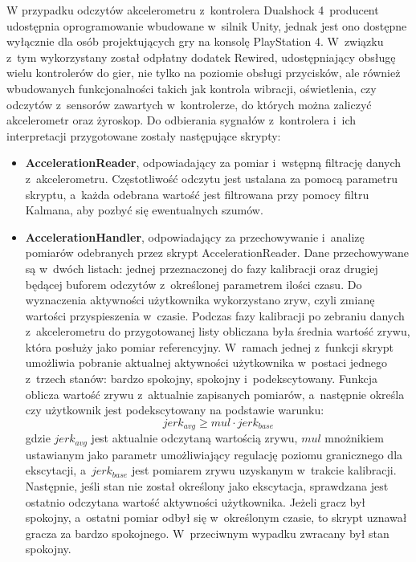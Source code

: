 W przypadku odczytów akcelerometru z~kontrolera Dualshock 4~producent udostępnia oprogramowanie wbudowane w~silnik Unity, jednak jest ono dostępne wyłącznie dla osób projektujących gry na konsolę PlayStation 4. W~związku z~tym wykorzystany został odpłatny dodatek Rewired, udostępniający obsługę wielu kontrolerów do gier, nie tylko na poziomie obsługi przycisków, ale również wbudowanych funkcjonalności takich jak kontrola wibracji, oświetlenia, czy odczytów z~sensorów zawartych w~kontrolerze, do których można zaliczyć akcelerometr oraz żyroskop. Do odbierania sygnałów z~kontrolera i~ich interpretacji przygotowane zostały następujące skrypty:
\begin{itemize}
	\item \textbf{AccelerationReader}, odpowiadający za pomiar i~wstępną filtrację danych z~akcelerometru. Częstotliwość odczytu jest ustalana za pomocą parametru skryptu, a~każda odebrana wartość jest filtrowana przy pomocy filtru Kalmana, aby pozbyć się ewentualnych szumów.
	\item \textbf{AccelerationHandler}, odpowiadający za przechowywanie i~analizę pomiarów odebranych przez skrypt AccelerationReader. Dane przechowywane są w~dwóch listach: jednej przeznaczonej do fazy kalibracji oraz drugiej będącej buforem odczytów z~określonej parametrem ilości czasu. Do wyznaczenia aktywności użytkownika wykorzystano zryw, czyli zmianę wartości przyspieszenia w~czasie. Podczas fazy kalibracji po zebraniu danych z~akcelerometru do przygotowanej listy obliczana była średnia wartość zrywu, która posłuży jako pomiar referencyjny. W~ramach jednej z~funkcji skrypt umożliwia pobranie aktualnej aktywności użytkownika w~postaci jednego z~trzech stanów: bardzo spokojny, spokojny i~podekscytowany. Funkcja oblicza wartość zrywu z~aktualnie zapisanych pomiarów, a~następnie określa czy użytkownik jest podekscytowany na podstawie warunku:
	$$
	jerk_{avg} \geq mul \cdot jerk_{base}
	$$
	gdzie $jerk_{avg}$ jest aktualnie odczytaną wartością zrywu, $mul$ mnożnikiem ustawianym jako parametr umożliwiający regulację poziomu granicznego dla ekscytacji, a~$jerk_{base}$ jest pomiarem zrywu uzyskanym w~trakcie kalibracji. Następnie, jeśli stan nie został określony jako ekscytacja, sprawdzana jest ostatnio odczytana wartość aktywności użytkownika. Jeżeli gracz był spokojny, a~ostatni pomiar odbył się w~określonym czasie, to skrypt uznawał gracza za bardzo spokojnego. W~przeciwnym wypadku zwracany był stan spokojny.
\end{itemize}

